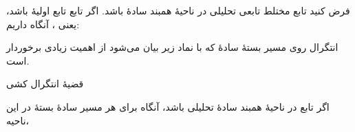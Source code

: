 
\EMhold


\begin{EMtheorem}{}

فرض کنید تابع مختلط  تابعی تحلیلی در ناحیهٔ همبند سادهٔ  باشد. اگر تابع  تابع اولیهٔ  باشد، یعنی ، آنگاه داریم:

\end{EMtheorem}

\begin{EMexample}{}


\end{EMexample}

\begin{EMexample}{}


\end{EMexample}

\begin{EMexample}{}


\end{EMexample}

\begin{EMexample}{}


\end{EMexample}


انتگرال روی مسیر بستهٔ سادهٔ  که با نماد زیر بیان می‌شود از اهمیت زیادی برخوردار است.

\begin{EMtheorem}{قضیهٔ انتگرال کشی}

اگر تابع  در ناحیهٔ همبند سادهٔ  تحلیلی باشد، آنگاه برای هر مسیر سادهٔ بستهٔ  در این ناحیه،

\end{EMtheorem}

